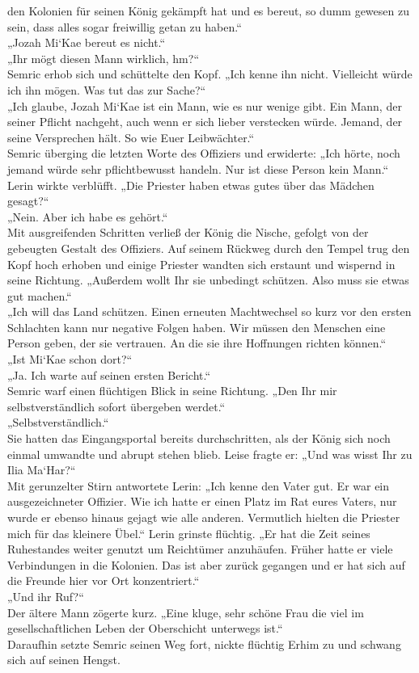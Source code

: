 den Kolonien für seinen König gekämpft hat und es bereut, so dumm gewesen zu sein, dass alles sogar 
freiwillig getan zu haben.“\\
„Jozah Mi‘Kae bereut es nicht.“\\
„Ihr mögt diesen Mann wirklich, hm?“\\
Semric erhob sich und schüttelte den Kopf. „Ich kenne ihn nicht. Vielleicht würde ich ihn mögen. Was 
tut das zur Sache?“\\
„Ich glaube, Jozah Mi‘Kae ist ein Mann, wie es nur wenige gibt. Ein Mann, der seiner Pflicht 
nachgeht, auch wenn er sich lieber verstecken würde. Jemand, der seine Versprechen hält. So wie Euer 
Leibwächter.“\\
Semric überging die letzten Worte des Offiziers und erwiderte: „Ich hörte, noch jemand würde sehr 
pflichtbewusst handeln. Nur ist diese Person kein Mann.“\\
Lerin wirkte verblüfft. „Die Priester haben etwas gutes über das Mädchen gesagt?“\\
„Nein. Aber ich habe es gehört.“\\
Mit ausgreifenden Schritten verließ der König die Nische, gefolgt von der gebeugten Gestalt des 
Offiziers. Auf seinem Rückweg durch den Tempel trug den Kopf hoch erhoben und einige Priester 
wandten sich erstaunt und wispernd in seine Richtung. „Außerdem wollt Ihr sie unbedingt schützen. 
Also muss sie etwas gut machen.“\\
„Ich will das Land schützen. Einen erneuten Machtwechsel so kurz vor den ersten Schlachten kann nur 
negative Folgen haben. Wir müssen den Menschen eine Person geben, der sie vertrauen. An die sie ihre 
Hoffnungen richten können.“\\
„Ist Mi‘Kae schon dort?“\\
„Ja. Ich warte auf seinen ersten Bericht.“\\
Semric warf einen flüchtigen Blick in seine Richtung. „Den Ihr mir selbstverständlich sofort 
übergeben werdet.“\\
„Selbstverständlich.“\\
Sie hatten das Eingangsportal bereits durchschritten, als der König sich noch einmal umwandte und 
abrupt stehen blieb. Leise fragte er: „Und was wisst Ihr zu Ilia Ma‘Har?“\\
Mit gerunzelter Stirn antwortete Lerin: „Ich kenne den Vater gut. Er war ein ausgezeichneter 
Offizier. Wie ich hatte er einen Platz im Rat eures Vaters, nur wurde er ebenso hinaus gejagt wie 
alle anderen. Vermutlich hielten die Priester mich für das kleinere Übel.“ Lerin grinste flüchtig. 
„Er hat die Zeit seines Ruhestandes weiter genutzt um Reichtümer anzuhäufen. Früher hatte er 
viele Verbindungen in die Kolonien. Das ist aber zurück gegangen und er hat sich auf die Freunde 
hier vor Ort konzentriert.“\\
„Und ihr Ruf?“\\
Der ältere Mann zögerte kurz. „Eine kluge, sehr schöne Frau die viel im gesellschaftlichen Leben der 
Oberschicht unterwegs ist.“\\
Daraufhin setzte Semric seinen Weg fort, nickte flüchtig Erhim zu und schwang sich auf seinen 
Hengst.\\


